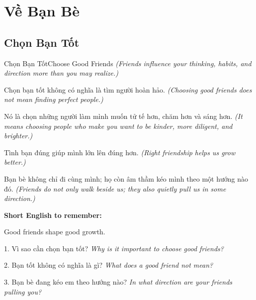 \chapter{Về Bạn Bè}

\section{Chọn Bạn Tốt}
\begin{truyen}{Chọn Bạn Tốt}{Choose Good Friends}
\textit{(Friends influence your thinking, habits, and direction more than you may realize.)}

Chọn bạn tốt không có nghĩa là tìm người hoàn hảo.
\textit{(Choosing good friends does not mean finding perfect people.)}

Nó là chọn những người làm mình muốn tử tế hơn, chăm hơn và sáng hơn.
\textit{(It means choosing people who make you want to be kinder, more diligent, and brighter.)}

Tình bạn đúng giúp mình lớn lên đúng hơn.
\textit{(Right friendship helps us grow better.)}
\end{truyen}

\begin{baihoc}
Bạn bè không chỉ đi cùng mình; họ còn âm thầm kéo mình theo một hướng nào đó.
\textit{(Friends do not only walk beside us; they also quietly pull us in some direction.)}
\end{baihoc}

\begin{ghinhoanh}
\textbf{Short English to remember:}

Good friends shape good growth.

\end{ghinhoanh}

\begin{tuhocnhanh}
1. Vì sao cần chọn bạn tốt? \textit{Why is it important to choose good friends?}

2. Bạn tốt không có nghĩa là gì? \textit{What does a good friend not mean?}

3. Bạn bè đang kéo em theo hướng nào? \textit{In what direction are your friends pulling you?}
\end{tuhocnhanh}
\ngancach

